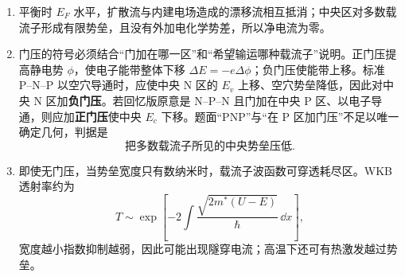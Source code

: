 \begin{question}[16 分]
\begin{solution}
\begin{enumerate}
\begin{center}
  \end{center}
  \item 平衡时 $E_F$ 水平，扩散流与内建电场造成的漂移流相互抵消；中央区对多数载流子形成有限势垒，且没有外加电化学势差，所以净电流为零。
  \item 门压的符号必须结合“门加在哪一区”和“希望输运哪种载流子”说明。正门压提高静电势 $\phi$，使电子能带整体下移 $\Delta E=-e\Delta\phi$；负门压使能带上移。标准 P--N--P 以空穴导通时，应使中央 N 区的 $E_v$ 上移、空穴势垒降低，因此对中央 N 区加\textbf{负门压}。若回忆版原意是 N--P--N 且门加在中央 P 区、以电子导通，则应加\textbf{正门压}使中央 $E_c$ 下移。题面“PNP”与“在 P 区加门压”不足以唯一确定几何，判据是
  \[
    \boxed{\text{把多数载流子所见的中央势垒压低}.}
  \]
  \item 即使无门压，当势垒宽度只有数纳米时，载流子波函数可穿透耗尽区。WKB 透射率约为
  \[
    T\sim\exp\left[-2\int\frac{\sqrt{2m^*(U-E)}}\hbar\,\dd x\right],
  \]
  宽度越小指数抑制越弱，因此可能出现隧穿电流；高温下还可有热激发越过势垒。
\end{enumerate}
\end{solution}
\end{question}


